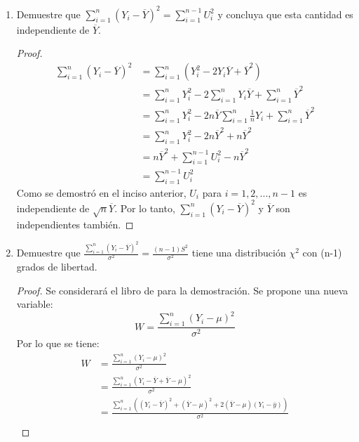 \documentclass[a4paper,12pt]{article}
\begin{document}
\begin{enumerate}
\begin{proof}
\begin{align*}
    &= 0
\end{align*}
Por lo cual, $L_i$ y $L_k$ son ortogonales y por lo tanto independientes. Por lo tanto, las funciones lineales $L_1, L_2, L_3,...,L_n$ son ortogonales por pares e independientes de acuerdo a la suposición de normalidad.
\end{proof}
\item  Demuestre que $\sum_{i=1}^{n}\left(Y_{i}-\overline{Y}\right)^{2}=\sum_{i=1}^{n-1} U_{i}^{2}$ y concluya que esta cantidad es independiente de $\overline{Y}$.
\begin{proof}
\begin{align*}
    \sum_{i=1}^{n}\left(Y_{i}-\overline{Y}\right)^{2} &= \sum_{i=1}^{n}\left(Y_{i}^2-2Y_{i}\overline{Y}+\overline{Y}^2\right)\\
    &= \sum_{i=1}^{n}Y_{i}^2-2\sum_{i=1}^{n}Y_{i}\overline{Y}+\sum_{i=1}^{n}\overline{Y}^2\\
    &= \sum_{i=1}^{n}Y_{i}^2-2n\overline{Y}\sum_{i=1}^{n}\frac{1}{n}Y_{i}+\sum_{i=1}^{n}\overline{Y}^2\\
    &= \sum_{i=1}^{n}Y_{i}^2-2n\overline{Y}^2+n\overline{Y}^2\\
    &= n \overline{Y}^{2}+\sum_{i=1}^{n-1} U_{i}^{2}-n\overline{Y}^2\\
    &= \sum_{i=1}^{n-1} U_{i}^{2}
\end{align*}
Como se demostró en el inciso anterior, $U_i$ para $i=1,2,...,n-1$ es independiente de $\sqrt{n}\overline{Y}$. Por lo tanto, $\sum_{i=1}^n(Y_i-\overline{Y})^2$ y $\overline{Y}$ son independientes también.
\end{proof}
\item  Demuestre que $\frac{\sum_{i=1}^{n}\left(Y_{i}-\overline{Y}\right)^{2}}{\sigma^{2}}=\frac{(n-1) S^{2}}{\sigma^{2}}$ tiene una distribución $\chi^{2}$ con (n-1) grados de libertad. 
\begin{proof}
Se considerará el libro de \cite{wackerly2014mathematical} para la demostración. Se propone una nueva variable:
$$W=\frac{\sum_{i=1}^{n}\left(Y_i-\mu\right)^2}{\sigma^2}$$
Por lo que se tiene: 
\begin{align*}
    W&=\frac{\sum_{i=1}^{n}\left(Y_i-\mu\right)^2}{\sigma^2}\\
 &=\frac{\sum_{i=1}^{n}\left(Y_{i}-\overline{Y}+\overline{Y}-\mu\right)^{2}}{\sigma^{2}} \\
&=\frac{\sum_{i=1}^{n}\left(\left(Y_{i}-\overline{Y}\right)^{2}+(\overline{Y}-\mu)^{2}+2(\overline{Y}-\mu)\left(Y_{i}-\overline{y}\right)\right)}{\sigma^{2}} \\

\end{align*}
\end{proof}
\end{enumerate}
\end{document}
